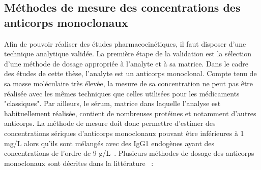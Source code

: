 \subsection{Méthodes de mesure des concentrations des anticorps monoclonaux}
Afin de pouvoir réaliser des études pharmacocinétiques, il faut disposer d'une technique analytique validée. La première étape de la validation est la sélection d'une méthode de dosage appropriée à l'analyte et à sa matrice. Dans le cadre des études de cette thèse, l'analyte est un anticorps monoclonal. Compte tenu de sa masse moléculaire très élevée, la mesure de sa concentration ne peut pas être réalisée avec les mêmes techniques que celles utilisées pour les médicaments "classiques". Par ailleurs, le sérum, matrice dans laquelle l'analyse est habituellement réalisée, contient de nombreuses protéines et notamment d'autres anticorps. La méthode de mesure doit donc permettre d'estimer des concentrations sériques d'anticorps monoclonaux pouvant être inférieures à 1 mg/L alors qu'ils sont mélangés avec des IgG1 endogènes ayant des concentrations de l'ordre de 9 g/L~\citep{REF90}. Plusieurs méthodes de dosage des anticorps monoclonaux sont décrites dans la littérature~\citep{REF91} :

